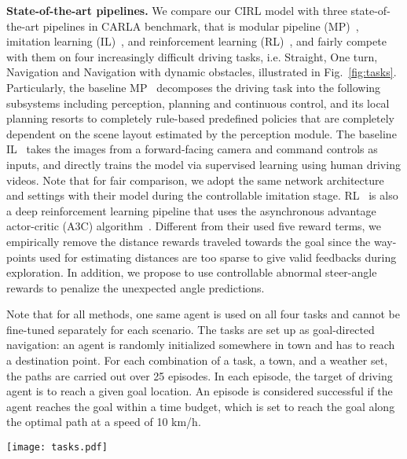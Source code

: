 \documentclass[runningheads]{llncs}
\begin{document}
\noindent\textbf{State-of-the-art pipelines.} We compare our CIRL model with three state-of-the-art pipelines in CARLA benchmark, that is modular pipeline (MP)~\cite{dosovitskiy2017carla}, imitation learning (IL)~\cite{dosovitskiy2017carla}, and reinforcement learning (RL)~\cite{dosovitskiy2017carla}, and fairly compete with them on four increasingly difficult driving tasks, i.e. Straight, One turn, Navigation and Navigation with dynamic obstacles, illustrated in Fig.~\ref{fig:tasks}. Particularly, the baseline MP~\cite{dosovitskiy2017carla} decomposes the driving task into the following subsystems including perception, planning and continuous control, and its local planning resorts to completely rule-based predefined policies that are completely dependent on the scene layout estimated by the perception module. The baseline IL~\cite{dosovitskiy2017carla} takes the images from a forward-facing camera and command controls as inputs, and directly trains the model via supervised learning using human driving videos. Note that for fair comparison, we adopt the same network architecture and settings with their model during the controllable imitation stage. RL~\cite{dosovitskiy2017carla} is also a deep reinforcement learning pipeline that uses the asynchronous advantage
actor-critic (A3C) algorithm~\cite{mnih2016asynchronous}. Different from their used five reward terms, we empirically remove the distance rewards traveled towards the goal since the way-points used for estimating distances are too sparse to give valid feedbacks during exploration. In addition, we propose to use controllable abnormal steer-angle rewards to penalize the unexpected angle predictions.

Note that for all methods, one same agent is used on all four tasks and cannot be fine-tuned separately for each scenario. The tasks are set up as goal-directed navigation: an agent is randomly initialized somewhere in town and has to reach a destination point. For each combination of a task, a town, and a weather set, the paths are carried out over 25 episodes. In each episode, the target of driving agent is to reach a given goal location. An episode is considered successful if the agent reaches the goal within a time budget, which is set to reach the goal along the optimal path at a speed of 10 km/h.


\begin{figure*}[!tp]
        \begin{center}
     \texttt{[image: tasks.pdf]}\vspace{-3mm}
            \caption{Illustrated observations of four different tasks in the bird view.}\vspace{-7mm}
            \label{fig:tasks}
        \end{center}
    \end{figure*}
    
\end{document}
